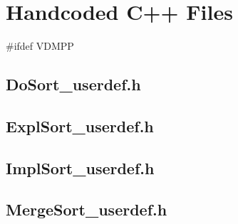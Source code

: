\documentclass[\pformat,12pt]{article}
\begin{document}
%
%
%
%
%
%
%
%
\section{Handcoded C++ Files}
\label{sec:handcodedfiles}

#ifdef VDMPP

\subsection{DoSort\_userdef.h}

\subsection{ExplSort\_userdef.h}

\subsection{ImplSort\_userdef.h}

\subsection{MergeSort\_userdef.h}
\end{document}
